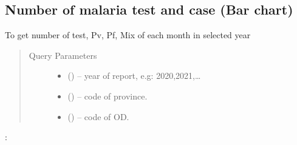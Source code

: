 \documentclass[letterpaper,10pt,english,openany,oneside]{sphinxmanual}
\begin{document}
\subsection{Number of malaria test and case (Bar chart)}
\label{\detokenize{api-cmi/v1:number-of-malaria-test-and-case-bar-chart}}

\begin{fulllineitems}
\label{\detokenize{api-cmi/v1:get--api-malaria-info-v1-Surveillance-malaria}}
\sphinxAtStartPar
To get number of test, Pv, Pf, Mix of each month in selected year
\begin{quote}\begin{description}
\item[{Query Parameters}] \leavevmode\begin{itemize}
\item {} 
\sphinxAtStartPar
{} () – year of report, e.g: 2020,2021,…

\item {} 
\sphinxAtStartPar
{} () – code of province.

\item {} 
\sphinxAtStartPar
{} () – code of OD.

\end{itemize}

\end{description}\end{quote}

\sphinxAtStartPar
{}:


\end{fulllineitems}
\end{document}

